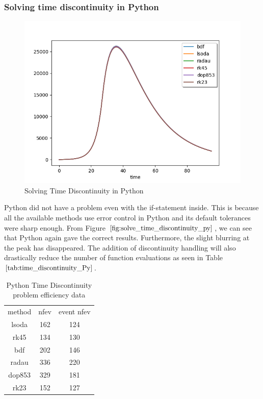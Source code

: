 \subsubsection{Solving time discontinuity in Python} 
\begin{figure}[h]
	\centering
	\includegraphics[width=0.7\linewidth]{./figures/solve_time_discontinuity_py}
	\caption{Solving Time Discontinuity in Python}
	\label{fig:solve_time_discontinuity_py}
\end{figure}
Python did not have a problem even with the if-statement inside. This is because all the available methods use error control in Python and its default tolerances were sharp enough. From Figure $\ref{fig:solve_time_discontinuity_py}$, we can see that Python again gave the correct results. Furthermore, the slight blurring at the peak has disappeared. The addition of discontinuity handling will also drastically reduce the number of function evaluations as seen in Table $\ref{tab:time_discontinuity_Py}$.

\begin{table}[h]
\caption {Python Time Discontinuity problem efficiency data} \label{tab:time_discontinuity_Py} 
\begin{center}
\begin{tabular}{ c c c }
 method & nfev & event nfev \\ 
lsoda  & 162 & 124 \\
rk45   & 134 & 130 \\
bdf    & 202 & 146 \\
radau  & 336 & 220 \\
dop853 & 329 & 181 \\
rk23   & 152 & 127 \\
\end{tabular}
\end{center}
\end{table}

